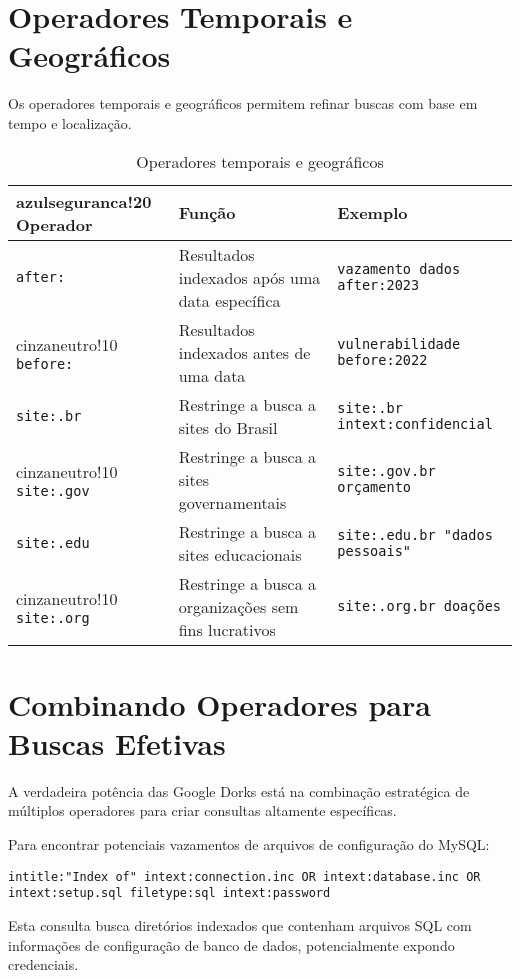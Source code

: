 \documentclass[12pt,a4paper]{book}
\begin{document}
\section{Operadores Temporais e Geográficos}

Os operadores temporais e geográficos permitem refinar buscas com base em tempo e localização.

\begin{table}[h]
\centering
\begin{tabular}{|p{2.5cm}|p{6cm}|p{5.5cm}|}
\hline
{azulseguranca!20} \textbf{Operador} & \textbf{Função} & \textbf{Exemplo} \\
\hline
\texttt{after:} & Resultados indexados após uma data específica & \texttt{vazamento dados after:2023} \\
\hline
{cinzaneutro!10} \texttt{before:} & Resultados indexados antes de uma data & \texttt{vulnerabilidade before:2022} \\
\hline
\texttt{site:.br} & Restringe a busca a sites do Brasil & \texttt{site:.br intext:confidencial} \\
\hline
{cinzaneutro!10} \texttt{site:.gov} & Restringe a busca a sites governamentais & \texttt{site:.gov.br orçamento} \\
\hline
\texttt{site:.edu} & Restringe a busca a sites educacionais & \texttt{site:.edu.br "dados pessoais"} \\
\hline
{cinzaneutro!10} \texttt{site:.org} & Restringe a busca a organizações sem fins lucrativos & \texttt{site:.org.br doações} \\
\hline
\end{tabular}
\caption{Operadores temporais e geográficos}
\end{table}

\section{Combinando Operadores para Buscas Efetivas}

A verdadeira potência das Google Dorks está na combinação estratégica de múltiplos operadores para criar consultas altamente específicas.

\begin{examplebox}
Para encontrar potenciais vazamentos de arquivos de configuração do MySQL:

\texttt{intitle:"Index of" intext:connection.inc OR intext:database.inc OR intext:setup.sql filetype:sql intext:password}

Esta consulta busca diretórios indexados que contenham arquivos SQL com informações de configuração de banco de dados, potencialmente expondo credenciais.
\end{examplebox}
\end{document}
